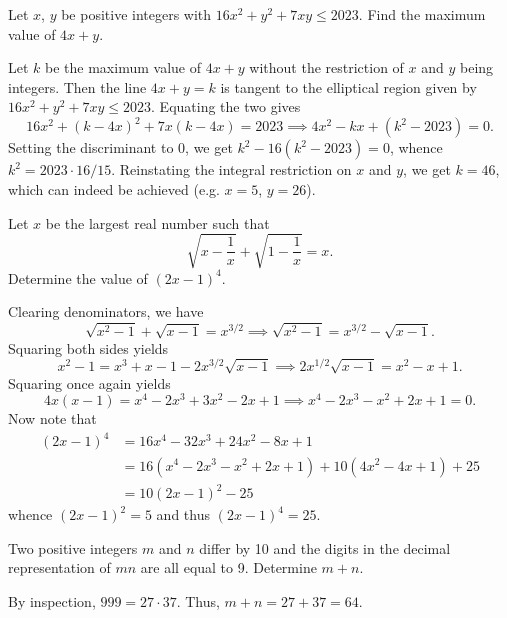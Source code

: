 \begin{question}[46]\label{A::2023-O-1-15}
    Let $x$, $y$ be positive integers with $16x^2 + y^2 + 7xy \leq 2023$. Find the maximum value of $4x + y$.
\end{question}
\begin{solution*}
    Let $k$ be the maximum value of $4x + y$ without the restriction of $x$ and $y$ being integers. Then the line $4x + y = k$ is tangent to the elliptical region given by $16x^2 + y^2 + 7xy \leq 2023$. Equating the two gives \[16x^2 + (k-4x)^2 + 7x(k-4x) = 2023 \implies 4x^2 - kx + (k^2 - 2023) = 0.\] Setting the discriminant to 0, we get $k^2 - 16(k^2 - 2023) = 0$, whence $k^2 = 2023 \cdot 16 / 15$. Reinstating the integral restriction on $x$ and $y$, we get $k = 46$, which can indeed be achieved (e.g. $x = 5$, $y = 26$).
\end{solution*}

\begin{question}[25]\label{A::2023-O-1-16}
    Let $x$ be the largest real number such that \[\sqrt{x - \dfrac1x} + \sqrt{1 - \dfrac1x} = x.\] Determine the value of $(2x-1)^4$.
\end{question}
\begin{solution*}
    Clearing denominators, we have \[\sqrt{x^2 - 1} + \sqrt{x - 1} = x^{3/2} \implies \sqrt{x^2 - 1} = x^{3/2} - \sqrt{x-1}.\] Squaring both sides yields \[x^2 - 1 = x^3 + x - 1 - 2x^{3/2}\sqrt{x-1} \implies 2x^{1/2}\sqrt{x-1} = x^2 - x + 1.\] Squaring once again yields \[4x(x-1) = x^4 - 2x^3 + 3x^2 - 2x + 1 \implies x^4 - 2x^3 - x^2 + 2x + 1 = 0.\] Now note that \begin{align*}
        (2x-1)^4 &= 16x^4 - 32 x^3 + 24x^2 - 8x + 1\\
        &= 16(x^4 - 2x^3 -x^2 + 2x + 1) + 10(4x^2 - 4x + 1) + 25\\
        &= 10(2x-1)^2 - 25
    \end{align*}
    whence $(2x-1)^2 = 5$ and thus $(2x-1)^4 = 25$.
\end{solution*}
   
\begin{question}[64]\label{A::2023-O-1-17}
    Two positive integers $m$ and $n$ differ by 10 and the digits in the decimal representation of $mn$ are all equal to 9. Determine $m + n$.
\end{question}
\begin{solution*}
    By inspection, $999 = 27 \cdot 37$. Thus, $m + n = 27 + 37 = 64$.
\end{solution*}
    
